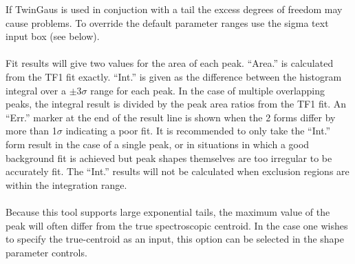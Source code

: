 \documentclass[a4paper,10pt]{article}
\begin{document}
If TwinGaus is used in conjuction with a tail the excess degrees of freedom may cause problems.
To override the default parameter ranges use the sigma text input box (see below).
\\
\\
Fit results will give two values for the area of each peak.
``Area.'' is calculated from the TF1 fit exactly.
``Int.'' is given as the difference between the histogram integral over a $\pm3\sigma$ range for each peak.
In the case of multiple overlapping peaks, the integral result is divided by the peak area ratios from the TF1 fit. 
An ``Err.'' marker at the end of the result line is shown when the 2 forms differ by more than 1$\sigma$ indicating a poor fit.
It is recommended to only take the ``Int.'' form result in the case of a single peak, or in situations in which a good background fit is achieved but peak shapes themselves are too irregular to be accurately fit.
The ``Int.'' results will not be calculated when exclusion regions are within the integration range.
\\
\\
Because this tool supports large exponential tails, the maximum value of the peak will often differ from the true spectroscopic centroid. In the case one wishes to specify the true-centroid as an input, this option can be selected in the shape parameter controls.
\end{document}
